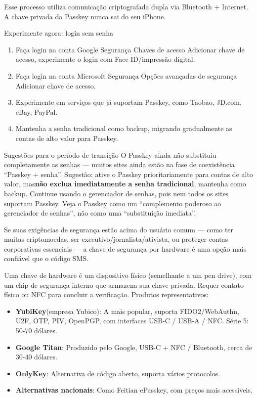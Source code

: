Esse processo utiliza comunicação criptografada dupla via Bluetooth + Internet. A chave privada da Passkey nunca sai do seu iPhone.

\begin{tcbpractice}{Experimente agora: login sem senha}
\begin{enumerate}
  \item Faça login na conta Google Segurança Chaves de acesso Adicionar chave de acesso, experimente o login com Face ID/impressão digital.
  \item Faça login na conta Microsoft Segurança Opções avançadas de segurança Adicionar chave de acesso.
  \item Experimente em serviços que já suportam Passkey, como Taobao, JD.com, eBay, PayPal.
  \item Mantenha a senha tradicional como backup, migrando gradualmente as contas de alto valor para Passkey.
\end{enumerate}

\end{tcbpractice}

\begin{tcbwarn}{Sugestões para o período de transição}
O Passkey ainda não substituiu completamente as senhas — muitos sites ainda estão na fase de coexistência “Passkey + senha”. Sugestão: ative o Passkey prioritariamente para contas de alto valor, mas\textbf{não exclua imediatamente a senha tradicional}, mantenha como backup. Continue usando o gerenciador de senhas, pois nem todos os sites suportam Passkey. Veja o Passkey como um “complemento poderoso ao gerenciador de senhas”, não como uma “substituição imediata”.

\end{tcbwarn}


Se suas exigências de segurança estão acima do usuário comum — como ter muitas criptomoedas, ser executivo/jornalista/ativista, ou proteger contas corporativas essenciais — a chave de segurança por hardware é uma opção mais confiável que o código SMS.


Uma chave de hardware é um dispositivo físico (semelhante a um pen drive), com um chip de segurança interno que armazena sua chave privada. Requer contato físico ou NFC para concluir a verificação. Produtos representativos:

\begin{itemize}
  \item \textbf{YubiKey}(empresa Yubico): A mais popular, suporta FIDO2/WebAuthn, U2F, OTP, PIV, OpenPGP, com interfaces USB-C / USB-A / NFC. Série 5: 50-70 dólares.
  \item \textbf{Google Titan}: Produzido pelo Google, USB-C + NFC / Bluetooth, cerca de 30-40 dólares.
  \item \textbf{OnlyKey}: Alternativa de código aberto, suporta vários protocolos.
  \item \textbf{Alternativas nacionais}: Como Feitian ePasskey, com preços mais acessíveis.
\end{itemize}

